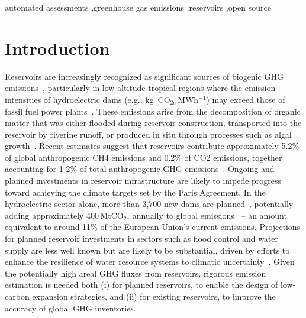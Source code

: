 \documentclass[final,1p,times]{elsarticle}
\begin{document}
\begin{frontmatter}
\begin{keyword}
automated assessments \sep greenhouse gas emissions \sep reservoirs \sep open source
\end{keyword}

\end{frontmatter}

\section{Introduction}
\label{sec:introduction}

Reservoirs are increasingly recognized as significant sources of biogenic \ac{GHG} emissions~\citep{Barros2011}, particularly in low-altitude tropical regions where the emission intensities of hydroelectric dams (e.g., kg~CO$_{2e}$\,MWh$^{-1}$) may exceed those of fossil fuel power plants~\citep{Fearnside2002}. 
These emissions arise from the decomposition of organic matter that was either flooded during reservoir construction, transported into the reservoir by riverine runoff, or produced in situ through processes such as algal growth~\citep{Louis2000}.
Recent estimates suggest that reservoirs contribute approximately 5.2\% of global anthropogenic \ac{CH4} emissions and 0.2\% of \ac{CO2} emissions, together accounting for 1-2\% of total anthropogenic \ac{GHG} emissions~\citep{Soued2022}.
Ongoing and planned investments in reservoir infrastructure are likely to impede progress toward achieving the climate targets set by the Paris Agreement.
In the hydroelectric sector alone, more than 3,700 new dams are planned~\citep{Zarfl2015,Bouckaert2021}, potentially adding approximately 400\,MtCO$_{2e}$ annually to global emissions~\citep{janus2025planning} -- an amount equivalent to around 11\% of the European Union’s current emissions.
Projections for planned reservoir investments in sectors such as flood control and water supply are less well known but are likely to be substantial, driven by efforts to enhance the resilience of water resource systems to climatic uncertainty~\cite{ipcc2018, Sarkodie2022}.
Given the potentially high areal \ac{GHG} fluxes from reservoirs, rigorous emission estimation is needed both (i) for planned reservoirs, to enable the design of low-carbon expansion strategies, and (ii) for existing reservoirs, to improve the accuracy of global \ac{GHG} inventories.
\end{document}
